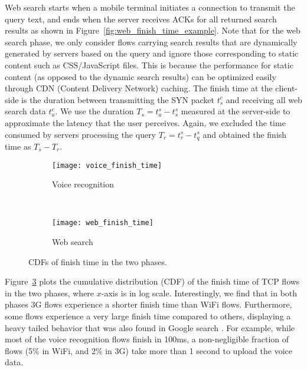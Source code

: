 Web search starts when a mobile terminal initiates a connection to transmit the query text, and ends when the server receives ACKs for all returned search results as shown in Figure~\ref{fig:web_finish_time_example}. Note that for the web search phase, we only consider flows carrying search results that are dynamically generated by servers based on the query and ignore those corresponding to static content such as CSS/JavaScript files. This is because the performance for static content (as opposed to the dynamic search results) can be optimized easily through CDN (Content Delivery Network) caching. The finish time at the client-side is the duration between transmitting the SYN packet $t^c_s$ and receiving all web search data $t^c_a$. We use the duration $T_s=t^s_a - t^s_s$ measured at the server-side to approximate the latency that the user perceives. Again, we excluded the time consumed by servers processing the query $T_r=t^s_r - t^s_q$ and obtained the finish time as $T_s-T_r$.

\begin{figure}[t]
\centering
\begin{subfigure}[b]{0.8\linewidth}
	\texttt{[image: voice\_finish\_time]}
\caption{Voice recognition}
\label{fig:voice_finish_time}
\end{subfigure} \\
\begin{subfigure}[b]{0.8\linewidth}
	\texttt{[image: web\_finish\_time]}
\caption{Web search}
\label{fig:web_finish_time}
\end{subfigure}
\caption{CDFs of finish time in the two phases.}
\label{fig:finish_time}
\end{figure}


Figure~\ref{fig:finish_time} plots the cumulative distribution (CDF) of the finish time of TCP flows in the two phases, where $x$-axis is in log scale. Interestingly, we find that in both phases 3G flows experience a shorter finish time than WiFi flows. Furthermore, some flows experience a very large finish time compared to others, displaying a heavy tailed behavior that was also found in Google search \cite{flach2013reducing}. For example, while most of the voice recognition flows finish in 100ms, a non-negligible fraction of flows (5\% in WiFi, and 2\% in 3G) take more than 1 second to upload the voice data. 



